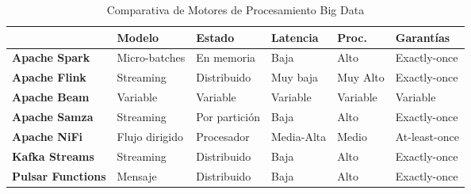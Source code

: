 \begin{table}[htbp]
    \footnotesize
    \renewcommand{\arraystretch}{1.2}
    \centering
    \caption{Comparativa de Motores de Procesamiento Big Data}
    \label{tab:comparison-engines}
    \setlength{\tabcolsep}{3pt}
    \begin{tabularx}{\textwidth}{|>{\raggedright\arraybackslash}m{2.2cm}|>{\raggedright\arraybackslash}m{}|>{\raggedright\arraybackslash}m{}|>{\raggedright\arraybackslash}m{}|>{\raggedright\arraybackslash}m{}|>{\raggedright\arraybackslash}m{}|}
    \hline
    \rule{0pt}{5ex} & \textbf{Modelo} & \textbf{Estado} & \textbf{Latencia} & \textbf{Proc.} & \textbf{Garantías} \\[0.3ex]
    \hline
    \textbf{Apache Spark} & Micro-batches & En memoria & Baja & Alto & Exactly-once \\[0.3ex]
    \hline
    \textbf{Apache Flink} & Streaming & Distribuido & Muy baja & Muy Alto & Exactly-once \\[0.3ex]
    \hline
    \textbf{Apache Beam} & Variable & Variable & Variable & Variable & Variable \\[0.3ex]
    \hline
    \textbf{Apache Samza} & Streaming & Por partición & Baja & Alto & Exactly-once \\[0.3ex]
    \hline
    \textbf{Apache NiFi} & Flujo dirigido & Procesador & Media-Alta & Medio & At-least-once \\[0.3ex]
    \hline
    \textbf{Kafka Streams} & Streaming & Distribuido & Baja & Alto & Exactly-once \\[0.3ex]
    \hline
    \textbf{Pulsar Functions} & Mensaje & Distribuido & Baja & Alto & Exactly-once \\[0.3ex]
    \hline
    \end{tabularx}
    \end{table}
\clearpage
\newpage